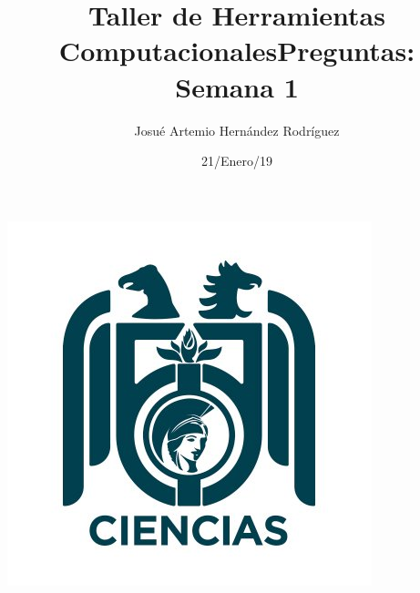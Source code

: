 \documentclass[letterpaper, 12pt, oneside]{article}%
\title{\Huge Taller de Herramientas Computacionales}
\author{Josué Artemio Hernández Rodríguez}%
\date{21/Enero/19}%
\begin{document}
\maketitle
\begin{center}%
\includegraphics[scale=0.2]{3.jpg}%
\end{center}%
\newpage%

\title{\huge Preguntas: Semana 1\\}%
\end{document}
